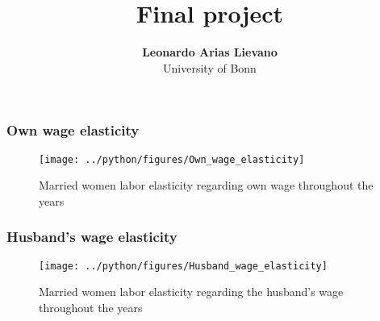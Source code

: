 \documentclass[aspectratio=169]{beamer}
\begin{document}
\title{Final project}

\author[Leonardo Arias Lievano ]
{
{\bf Leonardo Arias Lievano }\\
{\small University of Bonn}\\[1ex]
}


\begin{frame}
    \titlepage
    \note{~}
\end{frame}

\begin{frame}[t]
    \frametitle{Own wage elasticity}
    \begin{figure}

        \centering
        \texttt{[image: ../python/figures/Own\_wage\_elasticity]}

        \caption{ Married women labor elasticity regarding own wage
        throughout the years}
        \label{fig:own_wage}

    \end{figure}
\end{frame}



\begin{frame}[t]
    \frametitle{Husband's wage elasticity}
    \begin{figure}
        \centering
        \texttt{[image: ../python/figures/Husband\_wage\_elasticity]}

        \caption{Married women labor elasticity regarding the husband's wage
        throughout the years}
        \label{fig:husband_wage}

    \end{figure}
\end{frame}
\end{document}
